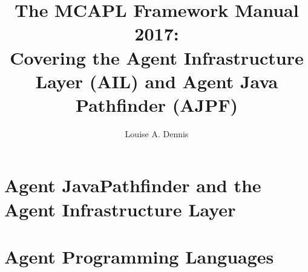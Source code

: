\documentclass[a4]{book}
\author{Louise A. Dennis}
\title{The MCAPL Framework Manual 2017: \\
Covering the Agent Infrastructure Layer (AIL) and Agent Java Pathfinder (AJPF)}
\begin{document}
\maketitle

\tableofcontents

\SetJava






\part{Agent JavaPathfinder and the Agent Infrastructure Layer}







\part{Agent Programming Languages}











\printindex
\end{document}
